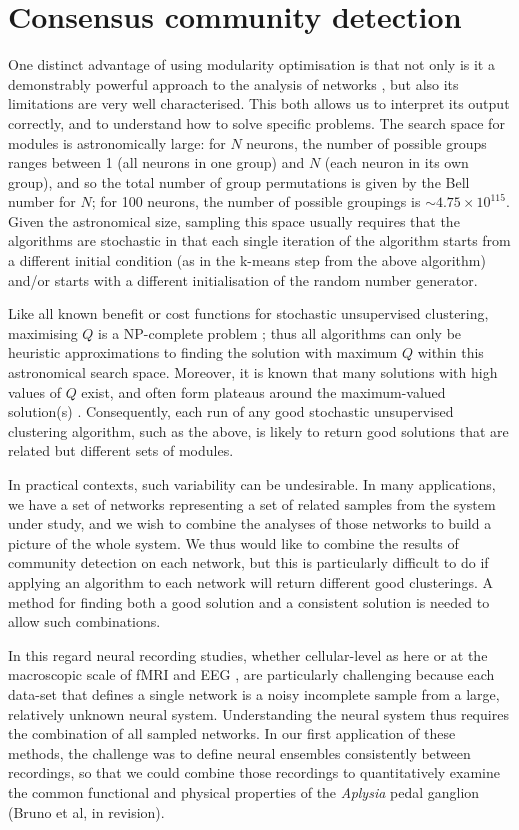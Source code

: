 \documentclass[11pt,a4paper]{article}
\begin{document}
\section{Consensus community detection}
One distinct advantage of using modularity optimisation is that not only is it a demonstrably powerful approach to the analysis of networks \citep{Newman2006a,Newman2006b,Nadakuditi2012}, but also its limitations are very well characterised. This both allows us to interpret its output correctly, and to understand how to solve specific problems. The search space for modules is astronomically large: for $N$ neurons, the number of possible groups ranges between 1 (all neurons in one group) and $N$ (each neuron in its own group), and so the total number of group permutations is given by the Bell number for $N$; for 100 neurons, the number of possible groupings is $\sim 4.75 \times 10^{115}$. Given the astronomical size, sampling this space usually requires that the algorithms are stochastic in that each single iteration of the algorithm starts from a different initial condition (as in the k-means step from the above algorithm) and/or starts with a different initialisation of the random number generator.

Like all known benefit or cost functions for stochastic unsupervised clustering, maximising $Q$ is a NP-complete problem \citep{Brandes2006}; thus all algorithms can only be heuristic approximations to finding the solution with maximum $Q$ within this astronomical search space. Moreover, it is known that many solutions with high values of $Q$ exist, and often form plateaus around the maximum-valued solution(s) \citep{Good2010}. Consequently, each run of any good stochastic unsupervised clustering algorithm, such as the above, is likely to return good solutions that are related but different sets of modules.

In practical contexts, such variability can be undesirable. In many applications, we have a set of networks representing a set of related samples from the system under study, and we wish to combine the analyses of those networks to build a picture of the whole system. We thus would like to combine the results of community detection on each network, but this is particularly difficult to do if applying an algorithm to each network will return different good clusterings. A method for finding both a good solution and a consistent solution is needed to allow such combinations.

In this regard neural recording studies, whether cellular-level as here or at the macroscopic scale of fMRI and EEG \citep{Bullmore2009}, are particularly challenging because each data-set that defines a single network is a noisy incomplete sample from a large, relatively unknown neural system. Understanding the neural system thus requires the combination of all sampled networks. In our first application of these methods, the challenge was to define neural ensembles consistently between recordings, so that we could combine those recordings to quantitatively examine the common functional and physical properties of the {\em Aplysia} pedal ganglion (Bruno et al, in revision).
\end{document}
